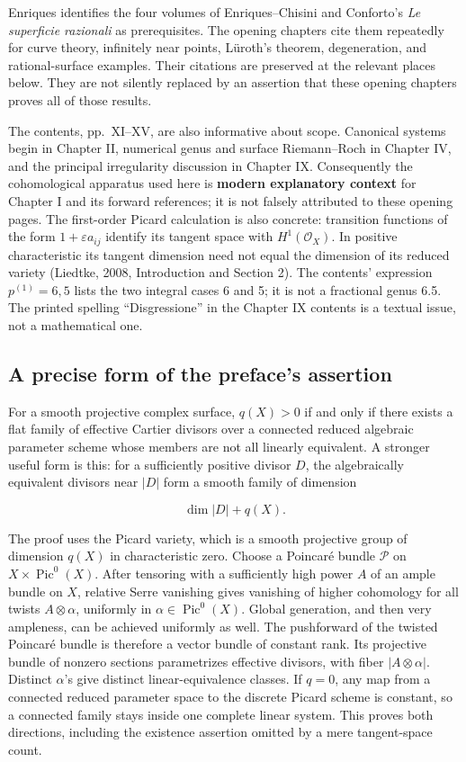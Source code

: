 Enriques identifies the four volumes of Enriques--Chisini and Conforto's \emph{Le superficie razionali} as prerequisites. The opening chapters cite them repeatedly for curve theory, infinitely near points, Lüroth's theorem, degeneration, and rational-surface examples. Their citations are preserved at the relevant places below. They are not silently replaced by an assertion that these opening chapters proves all of those results.

The contents, pp.~XI--XV, are also informative about scope. Canonical systems begin in Chapter II, numerical genus and surface Riemann--Roch in Chapter IV, and the principal irregularity discussion in Chapter IX. Consequently the cohomological apparatus used here is \textbf{modern explanatory context} for Chapter I and its forward references; it is not falsely attributed to these opening pages. The first-order Picard calculation is also concrete: transition functions of the form \(1+\varepsilon a_{ij}\) identify its tangent space with \(H^1(\mathcal O_X)\). In positive characteristic its tangent dimension need not equal the dimension of its reduced variety (Liedtke, 2008, Introduction and Section 2). The contents' expression \(p^{(1)}=6,5\) lists the two integral cases 6 and 5; it is not a fractional genus 6.5. The printed spelling ``Disgressione'' in the Chapter IX contents is a textual issue, not a mathematical one.

\subsection*{A precise form of the preface's assertion}

For a smooth projective complex surface, \(q(X)>0\) if and only if there exists a flat family of effective Cartier divisors over a connected reduced algebraic parameter scheme whose members are not all linearly equivalent. A stronger useful form is this: for a sufficiently positive divisor \(D\), the algebraically equivalent divisors near \(\lvert D\rvert\) form a smooth family of dimension

\[
\dim\lvert D\rvert+q(X).
\]

The proof uses the Picard variety, which is a smooth projective group of dimension \(q(X)\) in characteristic zero. Choose a Poincaré bundle \(\mathcal P\) on \(X\times\operatorname{Pic}^0(X)\). After tensoring with a sufficiently high power \(A\) of an ample bundle on \(X\), relative Serre vanishing gives vanishing of higher cohomology for all twists \(A\otimes\alpha\), uniformly in \(\alpha\in\operatorname{Pic}^0(X)\). Global generation, and then very ampleness, can be achieved uniformly as well. The pushforward of the twisted Poincaré bundle is therefore a vector bundle of constant rank. Its projective bundle of nonzero sections parametrizes effective divisors, with fiber \(\lvert A\otimes\alpha\rvert\). Distinct \(\alpha\)'s give distinct linear-equivalence classes. If \(q=0\), any map from a connected reduced parameter space to the discrete Picard scheme is constant, so a connected family stays inside one complete linear system. This proves both directions, including the existence assertion omitted by a mere tangent-space count.

